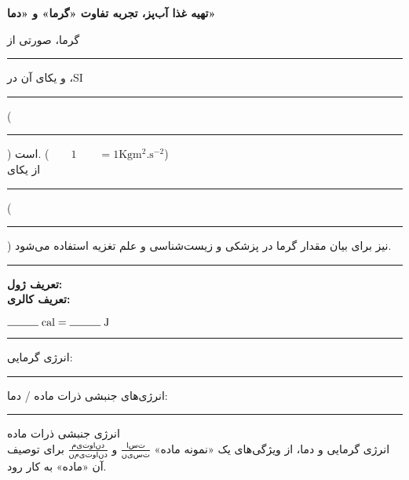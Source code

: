\documentclass[a4paper,12pt]{article}
\newcommand{\ff}{\rule{1cm}{0.15mm}\;}
\begin{document}
	\begin{center}
  	\textbf{تهیه غذا آب‌پز، تجربه تفاوت «گرما» و «دما»}
  \end{center}
گرما، صورتی از \ff و یکای آن در ،SI \ff (\ff) است.
 ($\mathrm{\qquad 1 \qquad = 1 Kgm^2.s^{-2}}$)\\
 از یکای \ff (\ff) نیز برای بیان مقدار گرما در پزشکی و زیست‌شناسی و علم تغزیه استفاده می‌شود.\\
	\hrule
	\vspace{4pt}
	\textbf{تعریف ژول:}\\
	\textbf{تعریف کالری:}
	\begin{flushleft}
 	 $\mathrm{\ff cal = \ff J}$ 
 \end{flushleft}
 	\vspace{4pt}
	\hrule
	\vspace{4pt}
 انرژی گرمایی: \ff انرژی‌های جنبشی ذرات ماده / دما: \ff انرژی جنبشی ذرات ماده\\
 انرژی گرمایی و دما، از ویژگی‌های یک «نمونه ماده» 
$\frac{است}{نیست}$
 و 
 $\frac{می‌تواند}{نمی‌تواند}$
 برای توصیف آن «ماده» به کار رود.

	\newpage

\end{document}
